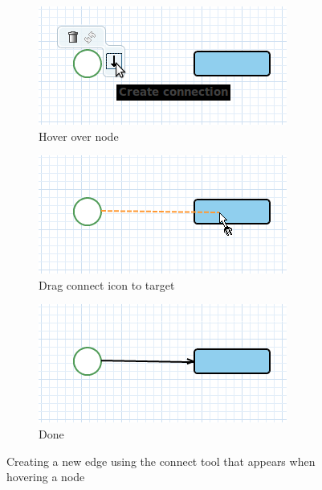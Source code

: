 \documentclass[a4paper,american,12pt]{scrreprt}
\begin{document}
\begin{figure}[h]
	\centering
	\begin{subfigure}[t]{0.30\textwidth}
		\includegraphics[width=\textwidth]{screenshots/connect1.png}
		\caption{Hover over node}
		\label{fig:connect1}
	\end{subfigure}
	\quad
	\begin{subfigure}[t]{0.30\textwidth}
		\includegraphics[width=\textwidth]{screenshots/connect2.png}
		\caption{Drag connect icon to target}
		\label{fig:connect2}
	\end{subfigure}
	\quad
	\begin{subfigure}[t]{0.30\textwidth}
		\includegraphics[width=\textwidth]{screenshots/connect3.png}
		\caption{Done}
		\label{fig:connect3}
	\end{subfigure}
	\caption{Creating a new edge using the connect tool that appears when
	hovering a node}
	\label{fig:connect}
\end{figure}
\end{document}
